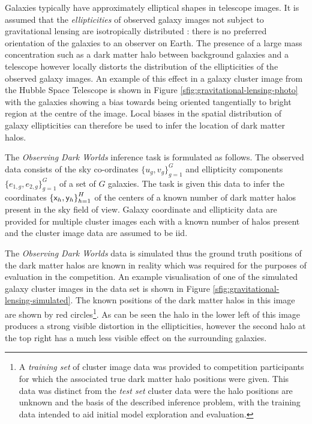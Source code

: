 Galaxies typically have approximately elliptical shapes in telescope images. It is assumed that the \emph{ellipticities} of observed galaxy images not subject to gravitational lensing are isotropically distributed \citep{bartelmann2001weak}: there is no preferred orientation of the galaxies to an observer on Earth. The presence of a large mass concentration such as a dark matter halo between background galaxies and a telescope however locally distorts the distribution of the ellipticities of the observed galaxy images. An example of this effect in a galaxy cluster image from the Hubble Space Telescope is shown in Figure \ref{sfig:gravitational-lensing-photo} with the galaxies showing a bias towards being oriented tangentially to bright region at the centre of the image. Local biases in the spatial distribution of galaxy ellipticities can therefore be used to infer the location of dark matter halos.

The \emph{Observing Dark Worlds} inference task is formulated as follows. The observed data consists of the sky co-ordinates $\lbrace u_g, v_g \rbrace_{g=1}^G$ and ellipticity components $\lbrace e_{1,g}, e_{2,g} \rbrace_{g=1}^G$ of a set of $G$ galaxies. The task is given this data to infer the coordinates $\lbr \rvar{x}_h, \rvar{y}_h\rbr_{h=1}^H$ of the centers of a known number of dark matter halos present in the sky field of view. Galaxy coordinate and ellipticity data are provided for multiple cluster images each with a known number of halos present and the cluster image data are assumed to be \ac{iid}.

The \emph{Observing Dark Worlds} data is simulated thus the ground truth positions of the dark matter halos are known in reality which was required for the purposes of evaluation in the competition. An example visualisation of one of the simulated galaxy cluster images in the data set is shown in Figure \ref{sfig:gravitational-lensing-simulated}. The known positions of the dark matter halos in this image are shown by red circles\footnote{A \emph{training set} of cluster image data was provided to competition participants for which the associated true dark matter halo positions were given. This data was distinct from the \emph{test set} cluster data were the halo positions are unknown and the basis of the described inference problem, with the training data intended to aid initial model exploration and evaluation.}. As can be seen the halo in the lower left of this image produces a strong visible distortion in the ellipticities, however the second halo at the top right has a much less visible effect on the surrounding galaxies. %

